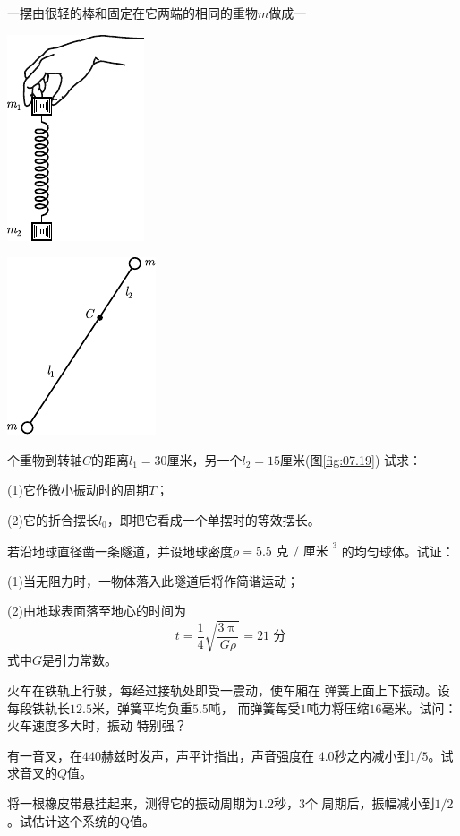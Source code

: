\begin{exercises}
\exercise 一摆由很轻的棒和固定在它两端的相同的重物$ m $做成一
\begin{figurex}
    \begin{minipage}[b]{0.5\linewidth}
        \centering
        \includegraphics{figure/fig07.18}
        \caption{}
        \label{fig:07.18}
    \end{minipage}
    \begin{minipage}[b]{0.5\linewidth}
        \centering
        \includegraphics{figure/fig07.19}
        \caption{}
        \label{fig:07.19}
    \end{minipage}
\end{figurex}
个重物到转轴$ C $的距离$ l _ { 1 } = 30 $厘米，另一个$ l _ { 2 } = 15 $厘米(图\ref{fig:07.19})
试求：

(1)它作微小振动时的周期$ T $；

(2)它的折合摆长$ l _ { 0 } $，即把它看成一个单摆时的等效摆长。

\exercise 若沿地球直径凿一条隧道，并设地球密度$ \rho = 5.5 \text { 克 } / \text { 厘米 } ^ { 3 } $
的均匀球体。试证：

(1)当无阻力时，一物体落入此隧道后将作简谐运动；

(2)由地球表面落至地心的时间为
\begin{equation*}
    t = \frac { 1 } { 4 } \sqrt { \frac { 3 \uppi } { G \rho } } = 21 \text { 分 }
\end{equation*}
式中$ G $是引力常数。

\exercise 火车在铁轨上行驶，每经过接轨处即受一震动，使车厢在
弹簧上面上下振动。设每段铁轨长$ 12.5 $米，弹簧平均负重$ 5.5 $吨，
而弹簧每受$ 1 $吨力将压缩$ 16 $毫米。试问：火车速度多大时，振动
特别强？

\exercise 有一音叉，在$ 440 $赫兹时发声，声平计指出，声音强度在
$ 4.0 $秒之内减小到$ 1/5 $。试求音叉的$ Q $值。

\exercise 将一根橡皮带悬挂起来，测得它的振动周期为$ 1.2 $秒，$ 3 $个
周期后，振幅减小到$ 1/2 $。试估计这个系统的$  $Q值。


\end{exercises}